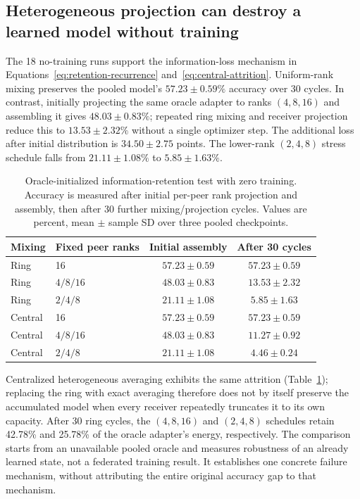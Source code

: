 \documentclass[11pt]{article}
\begin{document}
\subsection{Heterogeneous projection can destroy a learned model without training}
The 18 no-training runs support the information-loss mechanism in Equations~\eqref{eq:retention-recurrence} and~\eqref{eq:central-attrition}. Uniform-rank mixing preserves the pooled model's $57.23\pm0.59\%$ accuracy over 30 cycles. In contrast, initially projecting the same oracle adapter to ranks $(4,8,16)$ and assembling it gives $48.03\pm0.83\%$; repeated ring mixing and receiver projection reduce this to $13.53\pm2.32\%$ without a single optimizer step. The additional loss after initial distribution is $34.50\pm2.75$ points. The lower-rank $(2,4,8)$ stress schedule falls from $21.11\pm1.08\%$ to $5.85\pm1.63\%$.

\begin{table}[t]
\centering
\caption{Oracle-initialized information-retention test with zero training. Accuracy is measured after initial per-peer rank projection and assembly, then after 30 further mixing/projection cycles. Values are percent, mean $\pm$ sample SD over three pooled checkpoints.}
\label{tab:retention}
\small
\begin{tabular}{llcc}
\toprule
Mixing & Fixed peer ranks & Initial assembly & After 30 cycles\\
\midrule
Ring & 16 & $57.23\pm0.59$ & $57.23\pm0.59$\\
Ring & $4/8/16$ & $48.03\pm0.83$ & $13.53\pm2.32$\\
Ring & $2/4/8$ & $21.11\pm1.08$ & $5.85\pm1.63$\\
Central & 16 & $57.23\pm0.59$ & $57.23\pm0.59$\\
Central & $4/8/16$ & $48.03\pm0.83$ & $11.27\pm0.92$\\
Central & $2/4/8$ & $21.11\pm1.08$ & $4.46\pm0.24$\\
\bottomrule
\end{tabular}
\end{table}

Centralized heterogeneous averaging exhibits the same attrition (Table~\ref{tab:retention}); replacing the ring with exact averaging therefore does not by itself preserve the accumulated model when every receiver repeatedly truncates it to its own capacity. After 30 ring cycles, the $(4,8,16)$ and $(2,4,8)$ schedules retain 42.78\% and 25.78\% of the oracle adapter's energy, respectively. The comparison starts from an unavailable pooled oracle and measures robustness of an already learned state, not a federated training result. It establishes one concrete failure mechanism, without attributing the entire original accuracy gap to that mechanism.
\end{document}
